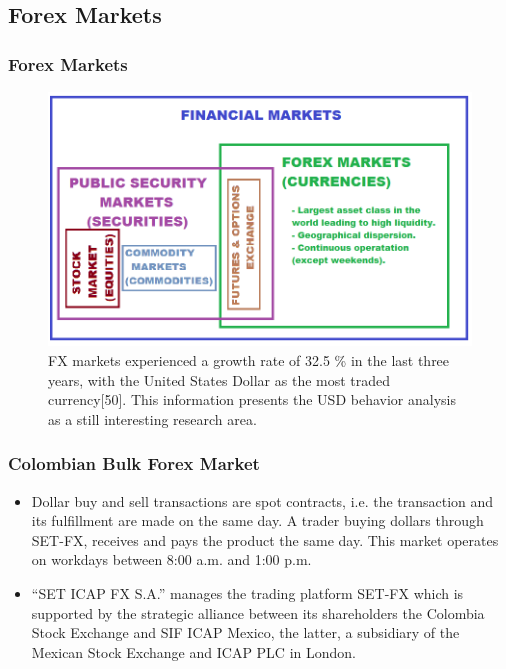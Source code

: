 \documentclass{beamer}
\begin{document}
\subsection{Forex Markets}
\begin{frame}
\frametitle{Forex Markets}

\begin{figure}
	\centering
		\includegraphics[scale=0.6]{FinancialMarkets.png}
	\caption{FX markets experienced a growth rate of 32.5 \% in the last three years, with the United
States Dollar as the most traded currency[50]. This information presents the USD behavior
analysis as a still interesting research area.}
	\label{fig:FinancialMarkets}
\end{figure}

\end{frame}

\begin{frame}
\frametitle{Colombian Bulk Forex Market}

\begin{itemize}
	\item Dollar buy and sell transactions are spot contracts, i.e. the transaction and its fulfillment are made on the same day. A trader buying dollars through SET-FX, receives and pays the product the same day. This market operates on workdays between 8:00 a.m. and 1:00 p.m.
	\item “SET ICAP FX S.A.” manages the trading platform SET-FX which is supported by the strategic alliance between its shareholders the Colombia Stock Exchange and SIF ICAP Mexico, the latter, a subsidiary of the Mexican Stock Exchange and ICAP PLC in London.
\end{itemize}

\end{frame}
\end{document}

